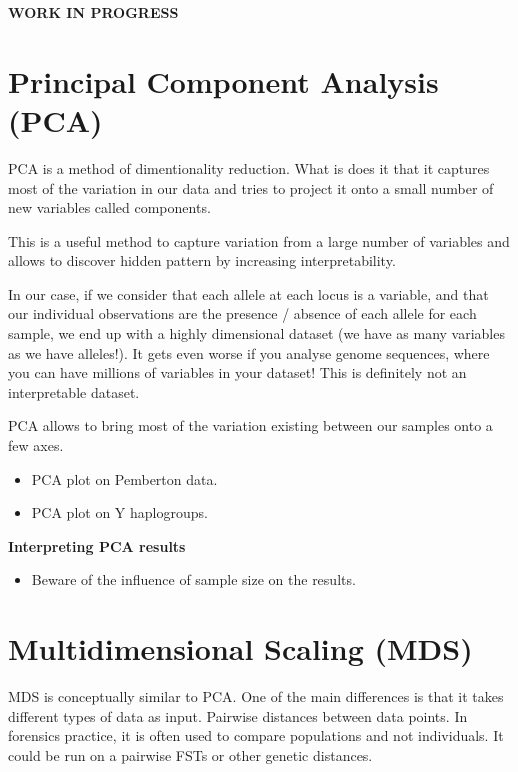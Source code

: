 \documentclass[
  a5paper]{book}
\providecommand{\tightlist}{%
  \setlength{\itemsep}{0pt}\setlength{\parskip}{0pt}}
\begin{document}
\textbf{WORK IN PROGRESS}

\hypertarget{principal-component-analysis-pca}{%
\section{Principal Component Analysis (PCA)}\label{principal-component-analysis-pca}}

PCA is a method of dimentionality reduction. What is does it that it captures most
of the variation in our data and tries to project it onto a small number of new
variables called components.

This is a useful method to capture variation from a large number of variables and
allows to discover hidden pattern by increasing interpretability.

In our case, if we consider that each allele at each locus is a variable, and that
our individual observations are the presence / absence of each allele for each sample,
we end up with a highly dimensional dataset (we have as many variables as we have
alleles!). It gets even worse if you analyse genome sequences, where you can have millions
of variables in your dataset! This is definitely not an interpretable dataset.

PCA allows to bring most of the variation existing between our samples onto a few
axes.

\begin{itemize}
\item
  PCA plot on Pemberton data.
\item
  PCA plot on Y haplogroups.
\end{itemize}

\textbf{Interpreting PCA results}

\begin{itemize}
\tightlist
\item
  Beware of the influence of sample size on the results.
\end{itemize}

\hypertarget{multidimensional-scaling-mds}{%
\section{Multidimensional Scaling (MDS)}\label{multidimensional-scaling-mds}}

MDS is conceptually similar to PCA. One of the main differences is that it takes
different types of data as input. Pairwise distances between data points. In forensics practice, it is often used to compare populations and not individuals.
It could be run on a pairwise FSTs or other genetic distances.
\end{document}
